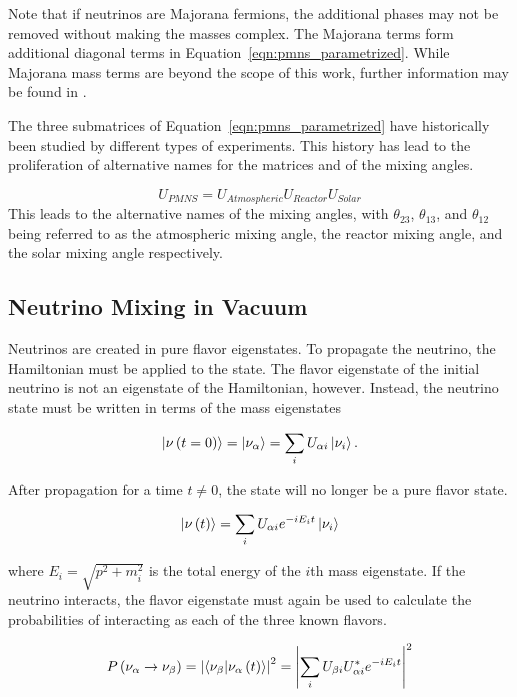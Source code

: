 Note that if neutrinos are Majorana fermions, the additional phases may not be removed without making the masses complex.
The Majorana terms form additional diagonal terms in Equation~\ref{eqn:pmns_parametrized}.
While Majorana mass terms are beyond the scope of this work, further information may be found in \cite{Review-PMNS,Review-MajoranaNu}.

The three submatrices of Equation~\ref{eqn:pmns_parametrized} have historically been studied by different types of experiments. 
This history has lead to the proliferation of alternative names for the matrices and of the mixing angles.

\begin{equation}
U_{PMNS} = U_{Atmospheric} U_{Reactor} U_{Solar}
\end{equation}
%
This leads to the alternative names of the mixing angles, with ${\theta_{23}}$, ${\theta_{13}}$, and ${\theta_{12}}$ being referred to as the atmospheric mixing angle, the reactor mixing angle, and the solar mixing angle respectively.

\subsection{Neutrino Mixing in Vacuum}
\label{subsec:vacuum}
Neutrinos are created in pure flavor eigenstates.
To propagate the neutrino, the Hamiltonian must be applied to the state.
The flavor eigenstate of the initial neutrino is not an eigenstate of the Hamiltonian, however.
Instead, the neutrino state must be written in terms of the mass eigenstates

\begin{equation}
\ket{\nu\left(t=0\right)} = \ket{\nu_\alpha} = \sum_i U_{\alpha i} \ket{\nu_i}.
\end{equation}

After propagation for a time $t \neq 0$, the state will no longer be a pure flavor state.

\begin{equation}
\ket{\nu\left(t\right)} = \sum_i U_{\alpha i} e^{-iE_i t} \ket{\nu_i}
\end{equation}

where ${E_i} = \sqrt{p^2+m_i^2}$ is the total energy of the ${i}$th mass eigenstate.
If the neutrino interacts, the flavor eigenstate must again be used to calculate the probabilities of interacting as each of the three known flavors.

\begin{equation}
P\left(\nu_\alpha\rightarrow\nu_\beta\right) = \left|\bra{\nu_\beta}\ket{\nu_\alpha\left(t\right)}\right|^2 
                 															= \left|\sum_i U_{\beta i} U^*_{\alpha i} e^{-i E_i t} \right|^2
\label{eqn:pmns_probability}
\end{equation}

